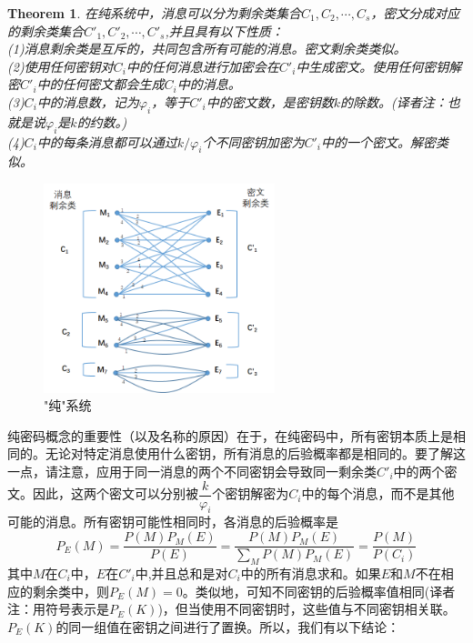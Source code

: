 \documentclass[]{article}
\newtheorem{theorem}{Theorem}
\begin{document}
\begin{theorem}\label{source:theorem3}
	在纯系统中，消息可以分为剩余类集合$C_1,C_2,\cdots,C_s$，密文分成对应的剩余类集合$C'_1,C'_2,\cdots,C'_s$,并且具有以下性质：\\
	(1)消息剩余类是互斥的，共同包含所有可能的消息。密文剩余类类似。\\
	(2)使用任何密钥对$C_i$中的任何消息进行加密会在$C'_i$中生成密文。使用任何密钥解密$C'_i$中的任何密文都会生成$C_i$中的消息。\\
	(3)$C_i$中的消息数，记为$\varphi_i$，等于$C'_i$中的密文数，是密钥数$k$的除数。(译者注：也就是说$\varphi_i$是$k$的约数。)\\
	(4)$C_i$中的每条消息都可以通过$k/\varphi_i$个不同密钥加密为$C'_i$中的一个密文。解密类似。
\end{theorem}

\begin{figure}[htbp]
	\centering
	\includegraphics[width=0.6\textwidth]{pure-system.png}
	\caption{"纯"系统}
	\label{Fig:fig4}
\end{figure}

纯密码概念的重要性（以及名称的原因）在于，在纯密码中，所有密钥本质上是相同的。无论对特定消息使用什么密钥，所有消息的后验概率都是相同的。要了解这一点，请注意，应用于同一消息的两个不同密钥会导致同一剩余类$C'_i$中的两个密文。因此，这两个密文可以分别被$\dfrac{k}{\varphi_i}$个密钥解密为$C_i$中的每个消息，而不是其他可能的消息。所有密钥可能性相同时，各消息的后验概率是
\[P_E(M)=\frac{P(M)P_M(E)}{P(E)}= \frac{P(M)P_M(E)}{\sum_M P(M)P_M(E)} =  \frac{P(M)}{P(C_i)}\]
其中$M$在$C_i$中，$E$在$C'_i$中,并且总和是对$C_i$中的所有消息求和。如果$E$和$M$不在相应的剩余类中，则$P_E(M)=0$。类似地，可知不同密钥的后验概率值相同(译者注：用符号表示是$P_E(K)$)，但当使用不同密钥时，这些值与不同密钥相关联。$P_E(K)$的同一组值在密钥之间进行了置换。所以，我们有以下结论：
\end{document}
